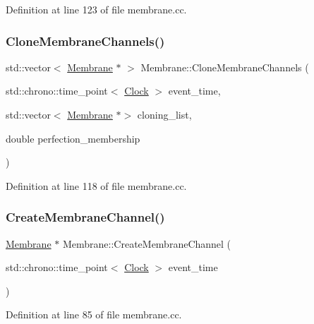 Definition at line 123 of file membrane.\+cc.

\mbox{\label{class_membrane_aa9958ea461092c0d2aceb07c9c34373c}} 
\subsubsection{\texorpdfstring{Clone\+Membrane\+Channels()}{CloneMembraneChannels()}}
{\footnotesize\ttfamily std\+::vector$<$ \mbox{\hyperlink{class_membrane}{Membrane}} $\ast$ $>$ Membrane\+::\+Clone\+Membrane\+Channels (\begin{DoxyParamCaption}\item[{std\+::chrono\+::time\+\_\+point$<$ \mbox{\hyperlink{universe_8h_a0ef8d951d1ca5ab3cfaf7ab4c7a6fd80}{Clock}} $>$}]{event\+\_\+time,  }\item[{std\+::vector$<$ \mbox{\hyperlink{class_membrane}{Membrane}} $\ast$$>$}]{cloning\+\_\+list,  }\item[{double}]{perfection\+\_\+membership }\end{DoxyParamCaption})}



Definition at line 118 of file membrane.\+cc.

\mbox{\label{class_membrane_a589b56529ac634a52b2a5fc78d356973}} 
\subsubsection{\texorpdfstring{Create\+Membrane\+Channel()}{CreateMembraneChannel()}}
{\footnotesize\ttfamily \mbox{\hyperlink{class_membrane}{Membrane}} $\ast$ Membrane\+::\+Create\+Membrane\+Channel (\begin{DoxyParamCaption}\item[{std\+::chrono\+::time\+\_\+point$<$ \mbox{\hyperlink{universe_8h_a0ef8d951d1ca5ab3cfaf7ab4c7a6fd80}{Clock}} $>$}]{event\+\_\+time }\end{DoxyParamCaption})}



Definition at line 85 of file membrane.\+cc.

